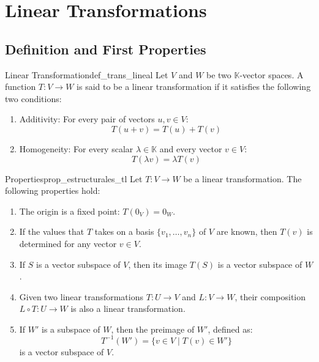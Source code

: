 \documentclass[11pt, a4paper]{article}
\begin{document}
\newpage

\section{Linear Transformations}

\subsection{Definition and First Properties}

\begin{definicion}{Linear Transformation}{def_trans_lineal}
Let $V$ and $W$ be two $\mathbb{K}$-vector spaces.
A function $T: V \to W$ is said to be a linear transformation if it satisfies the following two conditions:

\begin{enumerate}
    \item Additivity:
    For every pair of vectors $u, v \in V$:
    \[ T(u + v) = T(u) + T(v) \]
    \item Homogeneity:
    For every scalar $\lambda \in \mathbb{K}$ and every vector $v \in V$:
    \[ T(\lambda v) = \lambda T(v) \]
\end{enumerate}
\end{definicion}

\begin{proposicion}{Properties}{prop_estructurales_tl}
Let $T: V \to W$ be a linear transformation. The following properties hold:

\begin{enumerate}
    \item The origin is a fixed point: $T(0_V) = 0_W$.
    \item If the values that $T$ takes on a basis $\{v_1, \dots, v_n\}$ of $V$ are known, then $T(v)$ is determined for any vector $v \in V$.
    \item If $S$ is a vector subspace of $V$, then its image $T(S)$ is a vector subspace of $W$.
    \item Given two linear transformations $T: U \to V$ and $L: V \to W$, their composition $L \circ T: U \to W$ is also a linear transformation.
    \item If $W'$ is a subspace of $W$, then the preimage of $W'$, defined as:
    \[ T^{-1}(W') = \{ v \in V \mid T(v) \in W' \} \]
    is a vector subspace of $V$.
\end{enumerate}
\end{proposicion}
\end{document}
